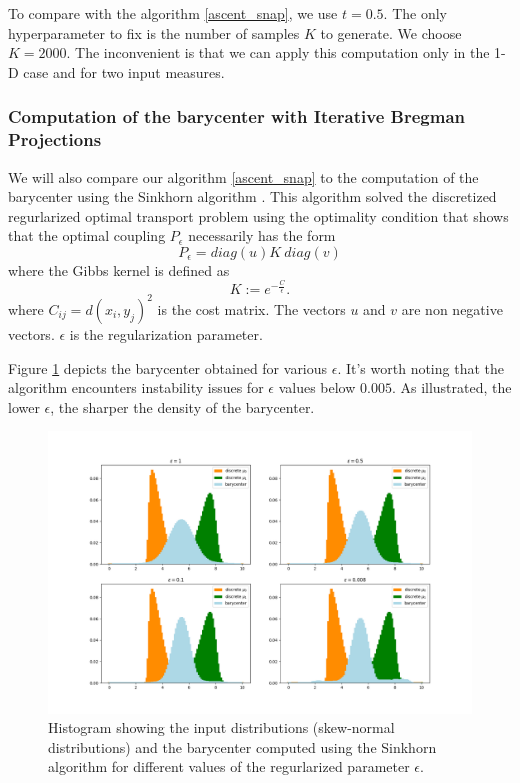 To compare with the algorithm \ref{ascent_snap}, we use $t=0.5$. The only hyperparameter to fix is the number of samples $K$ to generate. We choose $K=2000$. The inconvenient is that we can apply this computation only in the 1-D case and for two input measures.

\subsubsection{Computation of the barycenter with Iterative Bregman Projections} \label{sec:iterative_bregman}

We will also compare our algorithm \ref{ascent_snap} to the computation of the barycenter using the Sinkhorn algorithm \cite{peyre_computational_2020}. This algorithm solved the discretized regurlarized optimal transport problem using the optimality condition that shows that the optimal coupling $P_\epsilon$ necessarily has the form 
$$P_\epsilon = diag\left(u\right) K\ diag\left(v\right)$$
where the Gibbs kernel is defined as
$$K := e^{-\frac{C}{\epsilon}}.$$
where $C_{ij} = d(x_i, y_j)^2$ is the cost matrix. The vectors $u$ and $v$ are non negative vectors. $\epsilon$ is the regularization parameter.

Figure \ref{fig:sinkhorn_1D_2skew} depicts the barycenter obtained for various $\epsilon$. It's worth noting that the algorithm encounters instability issues for $\epsilon$ values below $0.005$. As illustrated, the lower $\epsilon$, the sharper the density of the barycenter.

\begin{figure}
    \centering
    \includegraphics[width=\textwidth]{figures/sinkhorn_1D_2skew.png}
    \caption{Histogram showing the input distributions (skew-normal distributions) and the barycenter computed using the Sinkhorn algorithm for different values of the regurlarized parameter $\epsilon$.}
    \label{fig:sinkhorn_1D_2skew}
\end{figure}

